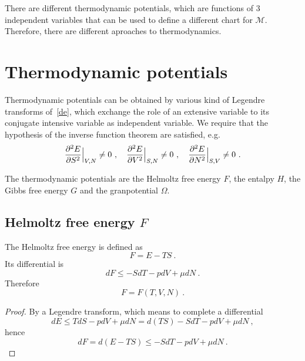     There are different thermodynamic potentials, which are functions of $3$ independent variables that can be used to define a different chart for $\mathcal M$. Therefore, there are different aproaches to thermodynamics.

\chapter{Thermodynamic potentials}

    Thermodynamic potentials can be obtained by various kind of Legendre transforms of~\eqref{de}, which exchange the role of an extensive variable to its conjugate intensive variable as independent variable. We require that the hypothesis of the inverse function theorem are satisfied, e.g. 
    \begin{equation*}
        \frac{\partial^2 E}{\partial S^2} \Big \vert_{V,N} \neq 0 ~, \quad \frac{\partial^2 E}{\partial V^2} \Big \vert_{S,N} \neq 0 ~, \quad \frac{\partial^2 E}{\partial N^2} \Big \vert_{S, V} \neq 0 ~.
    \end{equation*}

    The thermodynamic potentials are the Helmoltz free energy $F$, the entalpy $H$, the Gibbs free energy $G$ and the granpotential $\Omega$.

\section{Helmoltz free energy $F$} 

    The Helmoltz free energy is defined as 
    \begin{equation*}
        F = E - TS ~.
    \end{equation*}
    Its differential is 
    \begin{equation*}
        dF \leq - S dT - p dV + \mu dN ~.
    \end{equation*}
    Therefore
    \begin{equation*}
        F = F(T, V, N) ~.
    \end{equation*}
    \begin{proof}
        By a Legendre transform, which means to complete a differential
        \begin{equation*}
            dE \leq T dS - p dV + \mu dN = d(TS) - S dT - p dV + \mu dN ~,
        \end{equation*}
        hence 
        \begin{equation*}
            dF = d(E - TS) \leq - S dT - p dV + \mu dN ~.
        \end{equation*}
    \end{proof}

